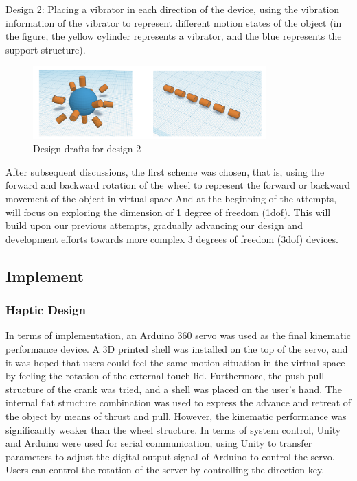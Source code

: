 Design 2:
Placing a vibrator in each direction of the device, using the vibration information of the vibrator to represent different motion states of the object (in the figure, the yellow cylinder represents a vibrator, and the blue represents the support structure).

\begin{figure}[h]
\centering
\includegraphics[width=0.8\textwidth]{A_thesis/figures/028.png}
\caption{Design drafts for design 2}
\end{figure}


After subsequent discussions, the first scheme was chosen, that is, using the forward and backward rotation of the wheel to represent the forward or backward movement of the object in virtual space.And at the beginning of the attempts, will focus on exploring the dimension of 1 degree of freedom (1dof). This will build upon our previous attempts, gradually advancing our design and development efforts towards more complex 3 degrees of freedom (3dof) devices.

\subsection{Implement}
\subsubsection{Haptic Design}
In terms of implementation, an Arduino 360 servo was used as the final kinematic performance device. A 3D printed shell was installed on the top of the servo, and it was hoped that users could feel the same motion situation in the virtual space by feeling the rotation of the external touch lid.
Furthermore, the push-pull structure of the crank was tried, and a shell was placed on the user's hand. The internal flat structure combination was used to express the advance and retreat of the object by means of thrust and pull. However, the kinematic performance was significantly weaker than the wheel structure.
In terms of system control, Unity and Arduino were used for serial communication, using Unity to transfer parameters to adjust the digital output signal of Arduino to control the servo. Users can control the rotation of the server by controlling the direction key.

